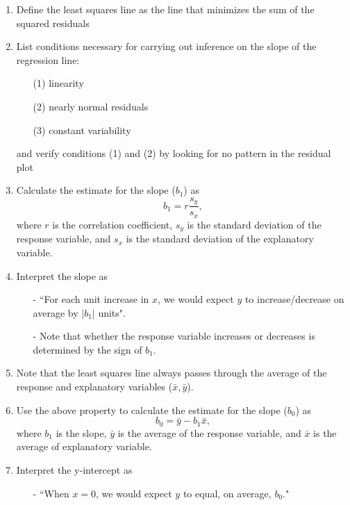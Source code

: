 \documentclass[11pt]{article}
\begin{document}
%

\vspace{0.48cm}

%
\begin{enumerate}[resume]
\renewcommand\labelenumi{\textcolor{light}{\textbf{LO \theenumi.}}}

\item Define the least squares line as the line that minimizes the sum of the squared residuals

\item List conditions necessary for carrying out inference on the slope of the regression line:
\begin{enumerate}
\item[(1)] linearity
\item[(2)] nearly normal residuals
\item[(3)] constant variability
\end{enumerate}
and verify conditions (1) and (2) by looking for no pattern in the residual plot


\item Calculate the estimate for the slope ($b_1$) as 
\[ b_1 = r\frac{s_y}{s_x}, \]
where $r$ is the correlation coefficient, $s_y$ is the standard deviation of the response variable, and $s_x$ is the standard deviation of the explanatory variable.

\item Interpret the slope as 
\begin{itemize}
\item[-] ``For each unit increase in $x$, we would expect $y$ to increase/decrease on average by $|b_1|$ units".
\item[-] Note that whether the response variable increases or decreases is determined by the sign of $b_1$.
\end{itemize}

\item Note that the least squares line always passes through the average of the response and explanatory variables ($\bar{x},\bar{y}$).

\item Use the above property to calculate the estimate for the slope ($b_0$) as 
\[ b_0 = \bar{y} - b_1 \bar{x}, \]
where $b_1$ is the slope, $\bar{y}$ is the average of the response variable, and $\bar{x}$ is the average of explanatory variable.

\item Interpret the y-intercept as
\begin{itemize}
\item[-] ``When $x = 0$, we would expect $y$ to equal, on average, $b_0$." 
\end{itemize}


\end{enumerate}
\end{document}
